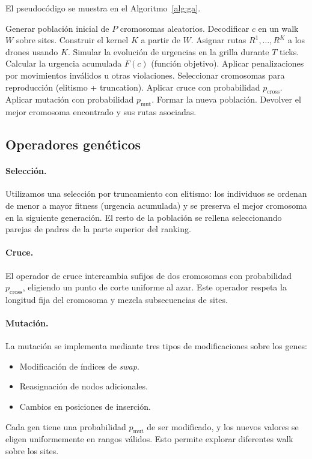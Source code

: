 \documentclass[11pt,a4paper]{article}
\begin{document}
El pseudocódigo se muestra en el Algoritmo~\ref{alg:ga}.

\begin{algorithm}[H]
\caption{Algoritmo genético para PSP-UAV}\label{alg:ga}
\begin{algorithmic}[1]
\STATE Generar población inicial de $P$ cromosomas aleatorios.
        \STATE Decodificar $c$ en un walk $W$ sobre sites.
        \STATE Construir el kernel $K$ a partir de $W$.
        \STATE Asignar rutas $R^1,\dots,R^K$ a los drones usando $K$.
        \STATE Simular la evolución de urgencias en la grilla durante $T$ ticks.
        \STATE Calcular la urgencia acumulada $F(c)$ (función objetivo).
        \STATE Aplicar penalizaciones por movimientos inválidos u otras violaciones.
    \ENDFOR
    \STATE Seleccionar cromosomas para reproducción (elitismo + truncation).
    \STATE Aplicar cruce con probabilidad $p_{\text{cross}}$.
    \STATE Aplicar mutación con probabilidad $p_{\text{mut}}$.
    \STATE Formar la nueva población.
\ENDFOR
\STATE Devolver el mejor cromosoma encontrado y sus rutas asociadas.
\end{algorithmic}
\end{algorithm}

\subsection{Operadores genéticos}

\paragraph{Selección.} Utilizamos una selección por truncamiento con elitismo: los individuos se ordenan de menor a mayor fitness (urgencia acumulada) y se preserva el mejor cromosoma en la siguiente generación. El resto de la población se rellena seleccionando parejas de padres de la parte superior del ranking.

\paragraph{Cruce.} El operador de cruce intercambia sufijos de dos cromosomas con probabilidad $p_{\text{cross}}$, eligiendo un punto de corte uniforme al azar. Este operador respeta la longitud fija del cromosoma y mezcla subsecuencias de sites.

\paragraph{Mutación.} La mutación se implementa mediante tres tipos de modificaciones sobre los genes:
\begin{itemize}
    \item Modificación de índices de \emph{swap}.
    \item Reasignación de nodos adicionales.
    \item Cambios en posiciones de inserción.
\end{itemize}
Cada gen tiene una probabilidad $p_{\text{mut}}$ de ser modificado, y los nuevos valores se eligen uniformemente en rangos válidos. Esto permite explorar diferentes walk sobre los sites.
\end{document}
